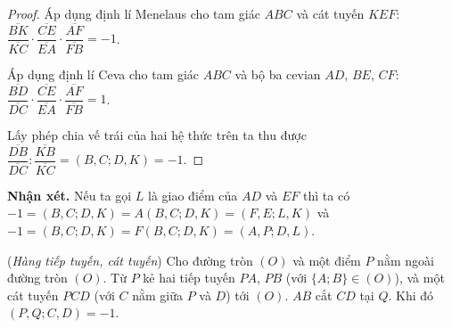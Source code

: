         \begin{proof}
            Áp dụng định lí Menelaus cho tam giác \(ABC\) và cát tuyến \(KEF\): \(\dfrac{\overline{BK}}{\overline{KC}} \cdot \dfrac{\overline{CE}}{\overline{EA}} \cdot \dfrac{\overline{AF}}{\overline{FB}} = -1\).

            Áp dụng định lí Ceva cho tam giác \(ABC\) và bộ ba cevian \(AD\), \(BE\), \(CF\): \(\dfrac{\overline{BD}}{\overline{DC}} \cdot \dfrac{\overline{CE}}{\overline{EA}} \cdot \dfrac{\overline{AF}}{\overline{FB}} = 1\).

            Lấy phép chia vế trái của hai hệ thức trên ta thu được \(\dfrac{\overline{DB}}{\overline{DC}} : \dfrac{\overline{KB}}{\overline{KC}} = (B,C;D,K) = -1\).
        \end{proof}

        \textbf{Nhận xét.} Nếu ta gọi \(L\) là giao điểm của \(AD\) và \(EF\) thì ta có \(-1 = (B,C;D,K) = A(B,C;D,K) = (F,E;L,K)\) và \(-1 = (B,C;D,K) = F(B,C;D,K) = (A,P;D,L)\).

        \begin{property}
            (\textit{Hàng tiếp tuyến, cát tuyến}) Cho đường tròn \((O)\) và một điểm \(P\) nằm ngoài đường tròn \((O)\). Từ \(P\) kẻ hai tiếp tuyến \(PA\), \(PB\) (với \(\{A;B\} \in (O)\)), và một cát tuyến \(PCD\) (với \(C\) nằm giữa \(P\) và \(D\)) tới \((O)\). \(AB\) cắt \(CD\) tại \(Q\). Khi đó \((P,Q;C,D) = -1\).
        \end{property}


